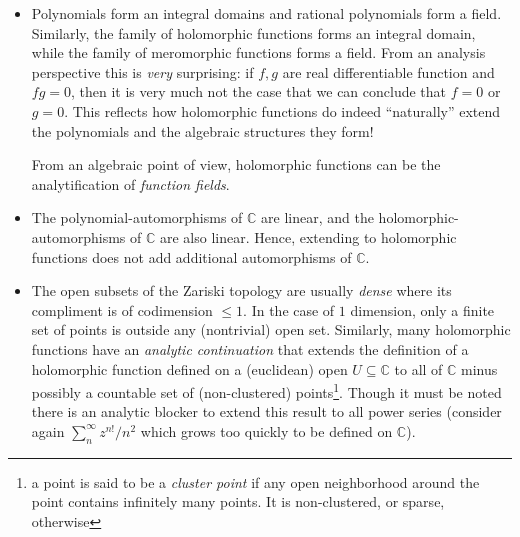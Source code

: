 \documentclass{article}
\newcommand{\C}{\mathbb{C}}
\newcommand{\sse}{\subseteq}
\begin{document}
\begin{itemize}
    \item Polynomials form an integral domains and rational polynomials form a field. Similarly, the family of
      holomorphic functions forms an integral domain, while the family of meromorphic functions forms a field.
      From an analysis perspective this is \emph{very} surprising: if $f,g$
      are real differentiable function and $fg = 0$, then it is very much not the case that we can conclude
      that $f = 0$ or $g = 0$. This reflects how holomorphic functions do indeed ``naturally'' extend
      the polynomials and the algebraic structures they form!

      From an algebraic point of view, holomorphic functions can be the analytification of \emph{function
      fields}.
  \item The polynomial-automorphisms of $\C$ are linear, and the holomorphic-automorphisms of $\C$ are also
    linear. Hence, extending to holomorphic functions does not add additional automorphisms of $\C$.
  \item The open subsets of the Zariski topology are usually \emph{dense} where its compliment is of
    codimension $\le 1$. In the case of $1$ dimension, only a finite set of points is outside any
    (nontrivial) open set. Similarly, many holomorphic functions have an \emph{analytic continuation} that
    extends the definition of a holomorphic function defined on a (euclidean) open $U \sse \C$ to all of $\C$ minus possibly a
    countable set of (non-clustered) points\footnote{a point is said to be a \emph{cluster point} if any
      open neighborhood around the point contains infinitely many points. It is non-clustered, or sparse,
    otherwise}. Though it must be noted there is an analytic blocker to extend this result to all power series
    (consider again $\sum_n^\infty z^{n!}/n^2$ which grows too quickly to be defined on $\C$).
\end{itemize}
\end{document}
